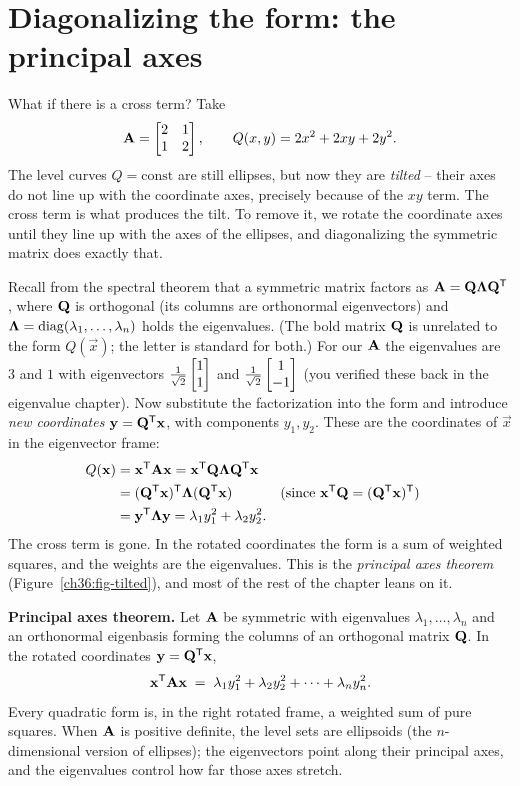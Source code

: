 \section{Diagonalizing the form: the principal axes}
\label{ch36:principal-axes}

What if there is a cross term? Take
\[
  \mathbf{A}=\begin{bmatrix} 2 & 1 \\ 1 & 2 \end{bmatrix},
  \qquad Q(x,y) = 2x^2 + 2xy + 2y^2.
\]
The level curves $Q=\text{const}$ are still ellipses, but now they are \emph{tilted}
-- their axes do not line up with the coordinate axes, precisely because of the $xy$
term. The cross term is what produces the tilt. To remove it, we rotate the coordinate
axes until they line up with the axes of the ellipses, and diagonalizing the symmetric
matrix does exactly that.

Recall from the spectral theorem that a symmetric matrix factors as
$\mathbf{A}=\mathbf{Q}\mathbf{\Lambda}\mathbf{Q}^{\mathsf{T}}$, where $\mathbf{Q}$ is orthogonal (its columns
are orthonormal eigenvectors) and $\mathbf{\Lambda}=\operatorname{diag}(\lambda_1,\dots,\lambda_n)$
holds the eigenvalues. (The bold matrix $\mathbf{Q}$ is unrelated to the form $Q(\vec{x})$;
the letter is standard for both.) For our $\mathbf{A}$ the eigenvalues are $3$ and $1$ with
eigenvectors $\tfrac{1}{\sqrt2}\begin{bmatrix}1\\1\end{bmatrix}$ and $\tfrac{1}{\sqrt2}\begin{bmatrix}1\\-1\end{bmatrix}$
(you verified these back in the eigenvalue chapter). Now substitute the factorization
into the form and introduce \emph{new coordinates} $\mathbf{y}=\mathbf{Q}^{\mathsf{T}}\mathbf{x}$, with
components $y_1,y_2$. These are the coordinates of $\vec{x}$ in the eigenvector frame:
\begin{align*}
  Q(\mathbf{x}) &= \mathbf{x}^{\mathsf{T}}\mathbf{A}\mathbf{x}
   = \mathbf{x}^{\mathsf{T}} \mathbf{Q}\mathbf{\Lambda}\mathbf{Q}^{\mathsf{T}} \mathbf{x}\\
  &= (\mathbf{Q}^{\mathsf{T}}\mathbf{x})^{\mathsf{T}} \mathbf{\Lambda} (\mathbf{Q}^{\mathsf{T}}\mathbf{x})
   && \text{(since } \mathbf{x}^{\mathsf{T}}\mathbf{Q} = (\mathbf{Q}^{\mathsf{T}}\mathbf{x})^{\mathsf{T}}\text{)}\\
  &= \mathbf{y}^{\mathsf{T}} \mathbf{\Lambda}\mathbf{y}
   = \lambda_1 y_1^2 + \lambda_2 y_2^2.
\end{align*}
The cross term is gone. In the rotated coordinates the form is a sum of
weighted squares, and the weights are the eigenvalues. This is the \emph{principal
axes theorem} (Figure~\ref{ch36:fig-tilted}), and most of the rest of the chapter leans on it.

\begin{formalbox}
\label{ch36:thm-principal-axes}
\textbf{Principal axes theorem.} Let $\mathbf{A}$ be symmetric with eigenvalues $\lambda_1,\dots,\lambda_n$ and an
orthonormal eigenbasis forming the columns of an orthogonal matrix $\mathbf{Q}$. In the
rotated coordinates $\mathbf{y}=\mathbf{Q}^{\mathsf{T}}\mathbf{x}$,
\[
  \mathbf{x}^{\mathsf{T}}\mathbf{A}\mathbf{x} \;=\; \lambda_1 y_1^2 + \lambda_2 y_2^2 + \cdots + \lambda_n y_n^2.
\]
Every quadratic form is, in the right rotated frame, a weighted sum of pure squares.
When $\mathbf{A}$ is positive definite, the level sets are ellipsoids (the
$n$-dimensional version of ellipses); the eigenvectors point along their principal
axes, and the eigenvalues control how far those axes stretch.
\end{formalbox}

